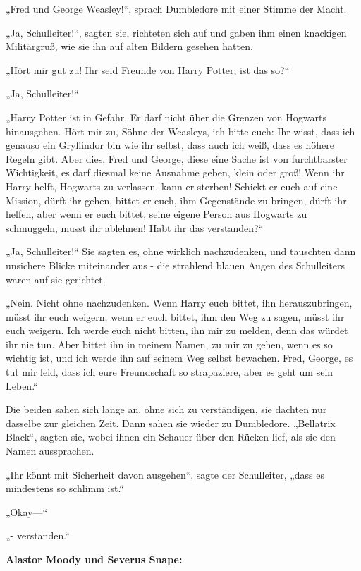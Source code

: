 {„Fred und George Weasley!“, sprach Dumbledore mit einer Stimme der Macht.

„Ja, Schulleiter!“, sagten sie, richteten sich auf und gaben ihm einen knackigen Militärgruß, wie sie ihn auf alten Bildern gesehen hatten.

„Hört mir gut zu! Ihr seid Freunde von Harry Potter, ist das so?“

„Ja, Schulleiter!“

„Harry Potter ist in Gefahr. Er darf nicht über die Grenzen von Hogwarts hinausgehen. Hört mir zu, Söhne der Weasleys, ich bitte euch: Ihr wisst, dass ich genauso ein Gryffindor bin wie ihr selbst, dass auch ich weiß, dass es höhere Regeln gibt. Aber dies, Fred und George, diese eine Sache ist von furchtbarster Wichtigkeit, es darf diesmal keine Ausnahme geben, klein oder groß! Wenn ihr Harry helft, Hogwarts zu verlassen, kann er sterben! Schickt er euch auf eine Mission, dürft ihr gehen, bittet er euch, ihm Gegenstände zu bringen, dürft ihr helfen, aber wenn er euch bittet, seine eigene Person aus Hogwarts zu schmuggeln, müsst ihr ablehnen! Habt ihr das verstanden?“

„Ja, Schulleiter!“ Sie sagten es, ohne wirklich nachzudenken, und tauschten dann unsichere Blicke miteinander aus - die strahlend blauen Augen des Schulleiters waren auf sie gerichtet.

„Nein. Nicht ohne nachzudenken. Wenn Harry euch bittet, ihn herauszubringen, müsst ihr euch weigern, wenn er euch bittet, ihm den Weg zu sagen, müsst ihr euch weigern. Ich werde euch nicht bitten, ihn mir zu melden, denn das würdet ihr nie tun. Aber bittet ihn in meinem Namen, zu mir zu gehen, wenn es so wichtig ist, und ich werde ihn auf seinem Weg selbst bewachen. Fred, George, es tut mir leid, dass ich eure Freundschaft so strapaziere, aber es geht um sein Leben.“

Die beiden sahen sich lange an, ohne sich zu verständigen, sie dachten nur dasselbe zur gleichen Zeit. Dann sahen sie wieder zu Dumbledore. „Bellatrix Black“, sagten sie, wobei ihnen ein Schauer über den Rücken lief, als sie den Namen aussprachen.

„Ihr könnt mit Sicherheit davon ausgehen“, sagte der Schulleiter, „dass es mindestens so schlimm ist.“

„Okay—“

„- verstanden.“

\textbf{Alastor Moody und Severus Snape:}

}
